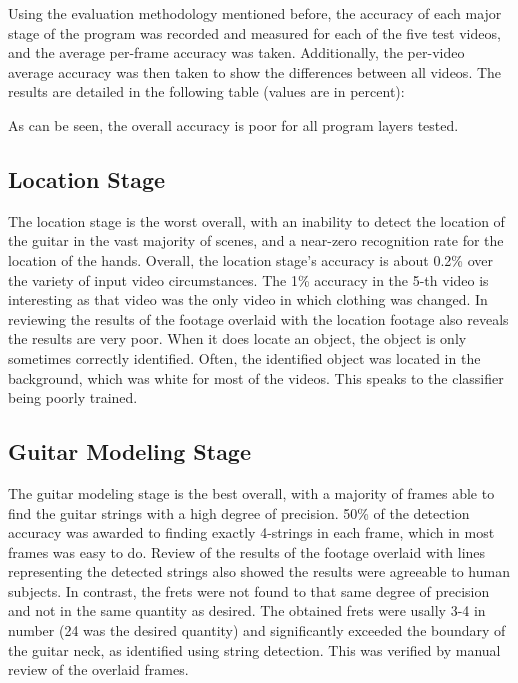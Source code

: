 Using the evaluation methodology mentioned before, the accuracy of each major stage of the program was
recorded and measured for each of the five test videos, and the average per-frame accuracy was taken.
Additionally, the per-video average accuracy was then taken to show the differences between all videos.
The results are detailed in the following table (values are in percent):
\vspace{5mm}

\begin{centering}

\end{centering}
\vspace{5mm}

As can be seen, the overall accuracy is poor for all program layers tested.
\subsection{Location Stage}
The location stage is the worst overall, with an inability to detect the location of the guitar
in the vast majority of scenes, and a near-zero recognition rate for the location of the hands.
Overall, the location stage's accuracy is about 0.2\% over the variety of input video circumstances.
The 1\% accuracy in the 5-th video is interesting as that video was the only video in which clothing was changed.
In reviewing the results of the footage overlaid with the location footage also reveals the results
are very poor. When it does locate an object, the object is only sometimes correctly identified.
Often, the identified object was located in the background, which was white for most of the videos.
This speaks to the classifier being poorly trained.

\subsection{Guitar Modeling Stage}
The guitar modeling stage is the best overall, with a majority of frames able to find the guitar strings
with a high degree of precision. 50\% of the detection accuracy was awarded to finding exactly 4-strings
in each frame, which in most frames was easy to do. Review of the results of the footage overlaid with lines
representing the detected strings also showed the results were agreeable to human subjects.
In contrast, the frets were not found to that same degree of precision and not in the same quantity as desired.
The obtained frets were usally 3-4 in number (24 was the desired quantity) and significantly exceeded the boundary
of the guitar neck, as identified using string detection. This was verified by manual review of the overlaid
frames.

